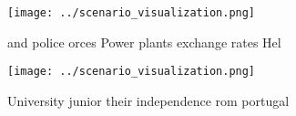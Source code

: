 \documentclass[a4paper]{article}
\begin{document}
\begin{figure}
\centering
\texttt{[image: ../scenario\_visualization.png]}
\caption{ and police orces Power plants exchange rates Hel
}
\end{figure}
 
\begin{figure}
\centering
\texttt{[image: ../scenario\_visualization.png]}
\caption{University junior their independence rom portugal
}
\end{figure}
 
\end{document}
